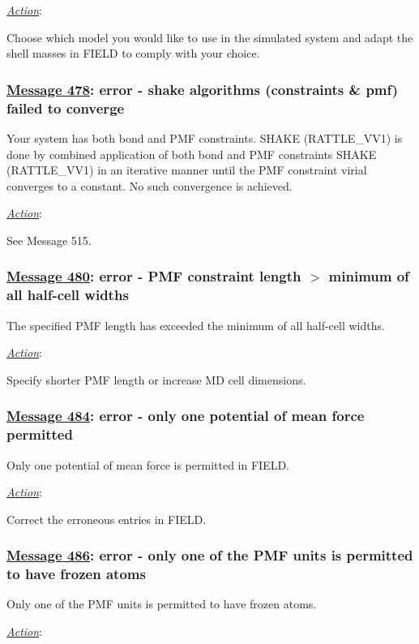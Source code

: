 \noindent \underline{\em Action}:

Choose which model you would like to use in the simulated system
and adapt the shell masses in FIELD to comply with your choice.

\subsubsection*{\underline{Message 478}: error - shake algorithms (constraints \& pmf) failed to converge}

Your system has both bond and PMF constraints.  SHAKE (RATTLE\_VV1)
is done by combined application of both bond and PMF constraints
SHAKE (RATTLE\_VV1) in an iterative manner until the PMF constraint
virial converges to a constant.  No such convergence is achieved.

\noindent \underline{\em Action}:

See Message 515.

\subsubsection*{\underline{Message 480}: error - PMF constraint length $>$ minimum of all half-cell widths}

The specified PMF length has exceeded the minimum of all half-cell
widths.

\noindent \underline{\em Action}:

Specify shorter PMF length or increase MD cell dimensions.

\subsubsection*{\underline{Message 484}: error - only one potential of mean force permitted}

Only one potential of mean force is permitted in FIELD.

\noindent \underline{\em Action}:

Correct the erroneous entries in FIELD.

\subsubsection*{\underline{Message 486}: error - only one of the PMF units is permitted to have frozen atoms}

Only one of the PMF units is permitted to have frozen atoms.

\noindent \underline{\em Action}:

